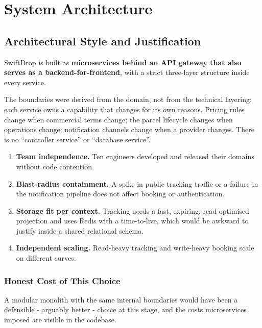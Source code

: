 \documentclass[11pt,a4paper,oneside,openany]{report}
\begin{document}
\chapter{System Architecture}

\section{Architectural Style and Justification}
SwiftDrop is built as \textbf{microservices behind an API gateway that also serves as a
backend-for-frontend}, with a strict three-layer structure inside every service.

The boundaries were derived from the domain, not from the technical layering: each service owns a
capability that changes for its own reasons. Pricing rules change when commercial terms change;
the parcel lifecycle changes when operations change; notification channels change when a provider
changes. There is no ``controller service'' or ``database service''.

\begin{enumerate}[leftmargin=*]
\item \textbf{Team independence.} Ten engineers developed and released their domains without code
contention.
\item \textbf{Blast-radius containment.} A spike in public tracking traffic or a failure in the
notification pipeline does not affect booking or authentication.
\item \textbf{Storage fit per context.} Tracking needs a fast, expiring, read-optimised projection
and uses Redis with a time-to-live, which would be awkward to justify inside a shared relational
schema.
\item \textbf{Independent scaling.} Read-heavy tracking and write-heavy booking scale on different
curves.
\end{enumerate}

\subsection{Honest Cost of This Choice}
A modular monolith with the same internal boundaries would have been a defensible - arguably
better - choice at this stage, and the costs microservices imposed are visible in the codebase.
\end{document}
